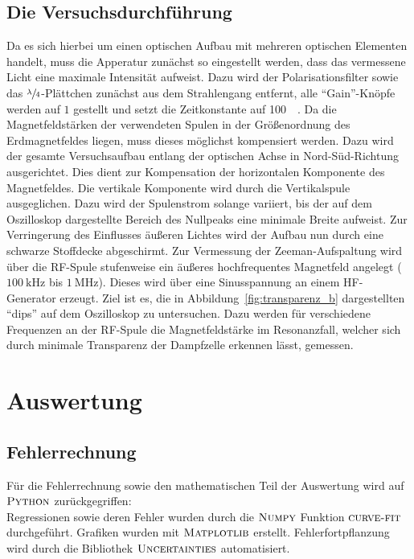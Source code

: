 \documentclass[
  bibliography=totoc,     %
  captions=tableheading,  %
  titlepage=firstiscover, %
]{scrartcl}
\begin{document}
\subsection{Die Versuchsdurchführung}
Da es sich hierbei um einen optischen Aufbau mit mehreren optischen Elementen
handelt, muss die Apperatur zunächst so eingestellt werden, dass das vermessene
Licht eine maximale Intensität aufweist. Dazu wird der Polarisationsfilter
sowie das $\sfrac{\lambda}{4}$-Plättchen zunächst aus dem Strahlengang entfernt,
alle \enquote{Gain}-Knöpfe werden auf $1$ gestellt und setzt die Zeitkonstante auf
\SI{100}{\milli\seconds}.
Da die Magnetfeldstärken der verwendeten Spulen in der Größenordnung des
Erdmagnetfeldes liegen, muss dieses möglichst kompensiert werden. Dazu wird der
gesamte Versuchsaufbau entlang der optischen Achse in Nord-Süd-Richtung
ausgerichtet. Dies dient zur Kompensation der horizontalen Komponente des
Magnetfeldes. Die vertikale Komponente wird durch die Vertikalspule
ausgeglichen. Dazu wird der Spulenstrom solange variiert, bis der auf dem
Oszilloskop dargestellte Bereich des Nullpeaks eine minimale Breite aufweist.
Zur Verringerung des Einflusses äußeren Lichtes wird der Aufbau nun durch eine
schwarze Stoffdecke abgeschirmt.
\clearpage
\noindent
Zur Vermessung der Zeeman-Aufspaltung wird über die RF-Spule stufenweise ein äußeres
hochfrequentes Magnetfeld angelegt ($\SI{100}{\kilo\hertz}$ bis $\SI{1}{\mega\hertz}$).
Dieses wird über eine Sinusspannung an einem HF-Generator erzeugt. Ziel ist es, die in
Abbildung~\ref{fig:transparenz_b} dargestellten \enquote{dips} auf dem Oszilloskop
zu untersuchen. Dazu werden für verschiedene Frequenzen an der RF-Spule die
Magnetfeldstärke im Resonanzfall, welcher sich durch minimale Transparenz der
Dampfzelle erkennen lässt, gemessen.\\
\clearpage
\section{Auswertung}
\label{sec:auswertung}
\subsection{Fehlerrechnung}
  Für die Fehlerrechnung sowie den mathematischen Teil der Auswertung wird auf
  $\textsc{Python}$ zurückgegriffen:\\
  Regressionen sowie deren Fehler wurden durch die $\textsc{Numpy}$ \cite{numpy} Funktion
  $\textsc{curve-fit}$ durchgeführt. Grafiken wurden mit $\textsc{Matplotlib}$ \cite{matplotlib}
  erstellt.
  Fehlerfortpflanzung wird durch die Bibliothek
  $\textsc{Uncertainties}$ \cite{uncertainties} automatisiert.
\end{document}
